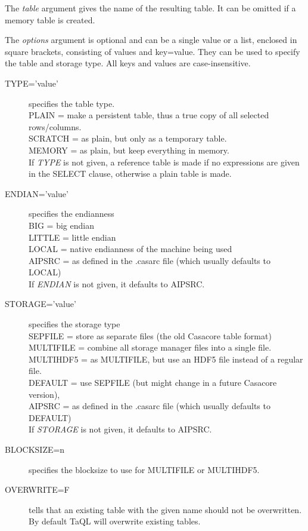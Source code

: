 The {\em table} argument gives the name of the resulting table. It can be
omitted if a memory table is created.

The {\em options} argument is optional and can be a single value or a list,
enclosed in square brackets, consisting of
values and key=value. They can be used to specify the table and
storage type. All keys and values are case-insensitive.
\begin{description}
  \item[TYPE='value' ]specifies the table type.
    \\PLAIN = make a persistent table, thus a true copy of all selected rows/columns.
    \\SCRATCH = as plain, but only as a temporary table. 
    \\MEMORY = as plain, but keep everything in memory.
    \\If {\em TYPE} is not given, a reference table is made if no
    expressions are given in the SELECT clause, otherwise a plain
    table is made.
  \item[ENDIAN='value' ]specifies the endianness
    \\BIG = big endian
    \\LITTLE = little endian
    \\LOCAL = native endianness of the machine being used
    \\AIPSRC = as defined in the .casarc file (which usually defaults to LOCAL)
    \\If {\em ENDIAN} is not given, it defaults to AIPSRC.
  \item[STORAGE='value' ]specifies the storage type
    \\SEPFILE = store as separate files (the old Casacore table format)
    \\MULTIFILE = combine all storage manager files into a single file.
    \\MULTIHDF5 = as MULTIFILE, but use an HDF5 file instead of a regular file.
    \\DEFAULT = use SEPFILE (but might change in a future Casacore version),
    \\AIPSRC = as defined in the .casarc file (which usually defaults to DEFAULT)
    \\If {\em STORAGE} is not given, it defaults to AIPSRC.
  \item[BLOCKSIZE=n ]specifies the blocksize to use for MULTIFILE or
    MULTIHDF5.
  \item[OVERWRITE=F ]tells that an existing table with the given name
    should not be overwritten. By default TaQL will overwrite existing tables.
\end{description}
